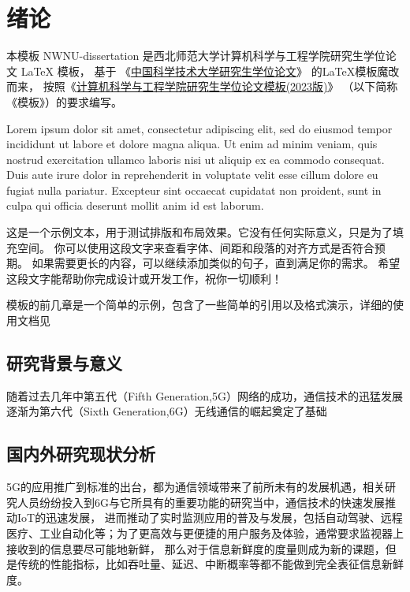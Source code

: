 
\chapter{绪论}

本模板 NWNU-dissertation 是西北师范大学计算机科学与工程学院研究生学位论文 \LaTeX{}
模板， 基于 《\href{https://github.com/ustctug/ustcthesis}{中国科学技术大学研究生学位论文}》
的\LaTeX{}模板魔改而来，
按照《\href{https://jsj.nwnu.edu.cn/2454/list.htm} {计算机科学与工程学院研究生学位论文模板(2023版)}》
（以下简称《模板》）的要求编写。

Lorem ipsum dolor sit amet, consectetur adipiscing elit, sed do eiusmod tempor
incididunt ut labore et dolore magna aliqua.
Ut enim ad minim veniam, quis nostrud exercitation ullamco laboris nisi ut
aliquip ex ea commodo consequat.
Duis aute irure dolor in reprehenderit in voluptate velit esse cillum dolore eu
fugiat nulla pariatur.
Excepteur sint occaecat cupidatat non proident, sunt in culpa qui officia
deserunt mollit anim id est laborum.

这是一个示例文本，用于测试排版和布局效果。它没有任何实际意义，只是为了填充空间。
你可以使用这段文字来查看字体、间距和段落的对齐方式是否符合预期。
如果需要更长的内容，可以继续添加类似的句子，直到满足你的需求。
希望这段文字能帮助你完成设计或开发工作，祝你一切顺利！

模板的前几章是一个简单的示例，包含了一些简单的引用以及格式演示，详细的使用文档见

\section{研究背景与意义}
随着过去几年中第五代（Fifth Generation,5G）网络的成功，通信技术的迅猛发展逐渐为第六代（Sixth Generation,6G）无线通信的崛起奠定了基础


\section{国内外研究现状分析}

5G的应用推广到标准的出台，都为通信领域带来了前所未有的发展机遇，相关研究人员纷纷投入到6G与它所具有的重要功能的研究当中，通信技术的快速发展推动IoT的迅速发展，
进而推动了实时监测应用的普及与发展，包括自动驾驶、远程医疗、工业自动化等；为了更高效与更便捷的用户服务及体验，通常要求监视器上接收到的信息要尽可能地新鲜，
那么对于信息新鲜度的度量则成为新的课题，但是传统的性能指标，比如吞吐量、延迟、中断概率等都不能做到完全表征信息新鲜度。

